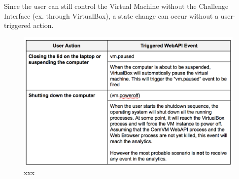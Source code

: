 \documentclass{article}
\begin{document}

Since the user can still control the Virtual Machine without the Challenge Interface (ex. through VirtualBox), a state change can occur without a user-triggered action.


\begin{figure}[t]
  \begin{center}
		\includegraphics[width=\columnwidth]{imgs/userActions-webAPIEventsTable.png}
  \end{center}
\caption{xxx}
\label{xxx}
\end{figure}









      
      

\end{document}
